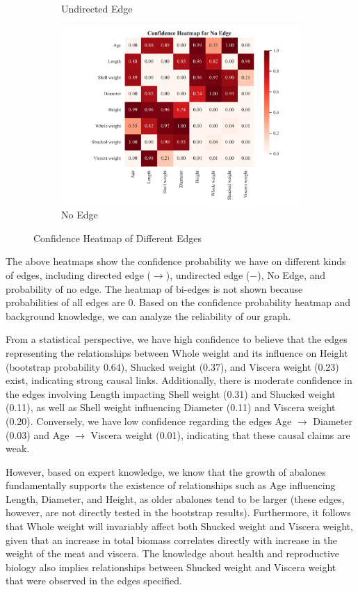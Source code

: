 \documentclass{article}
\begin{document}
\begin{figure}[H]
\begin{subfigure}{0.32\textwidth}
        \caption{Undirected Edge}
    \end{subfigure}
    \begin{subfigure}{0.32\textwidth}
        \centering
        \includegraphics[width=\linewidth]{./demo_data/20241104_121546/Abalone/output_graph/non_existence_confidence_heatmap.jpg}
        \caption{No Edge}
    \end{subfigure}
\caption{Confidence Heatmap of Different Edges}
\end{figure}        
The above heatmaps show the confidence probability we have on different kinds of edges, including directed edge ($\rightarrow$), undirected edge ($-$), No Edge, and probability of no edge. The heatmap of bi-edges is not shown because probabilities of all edges are 0. Based on the confidence probability heatmap and background knowledge, we can analyze the reliability of our graph.

From a statistical perspective, we have high confidence to believe that the edges representing the relationships between Whole weight and its influence on Height (bootstrap probability 0.64), Shucked weight (0.37), and Viscera weight (0.23) exist, indicating strong causal links. Additionally, there is moderate confidence in the edges involving Length impacting Shell weight (0.31) and Shucked weight (0.11), as well as Shell weight influencing Diameter (0.11) and Viscera weight (0.20). Conversely, we have low confidence regarding the edges Age $\rightarrow$ Diameter (0.03) and Age $\rightarrow$ Viscera weight (0.01), indicating that these causal claims are weak. 

However, based on expert knowledge, we know that the growth of abalones fundamentally supports the existence of relationships such as Age influencing Length, Diameter, and Height, as older abalones tend to be larger (these edges, however, are not directly tested in the bootstrap results). Furthermore, it follows that Whole weight will invariably affect both Shucked weight and Viscera weight, given that an increase in total biomass correlates directly with increase in the weight of the meat and viscera. The knowledge about health and reproductive biology also implies relationships between Shucked weight and Viscera weight that were observed in the edges specified.
\end{document}

